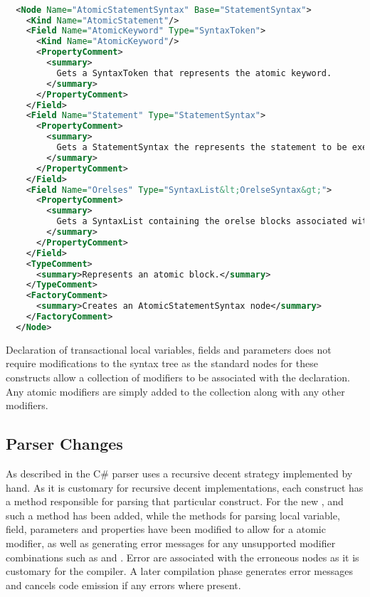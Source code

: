\begin{lstlisting}[label=lst:roslyn_extension_tre_xml,
  caption={AtomicStatement \ac{XML} definition},
  language=XML,  
  showspaces=false,
  showtabs=false,
  breaklines=true,
  showstringspaces=false,
  breakatwhitespace=true,
  escapechar=~,
  morekeywords={Name, Base, Type}]  % Start your code-block

  <Node Name="AtomicStatementSyntax" Base="StatementSyntax">
    <Kind Name="AtomicStatement"/>
    <Field Name="AtomicKeyword" Type="SyntaxToken">
      <Kind Name="AtomicKeyword"/>
      <PropertyComment>
        <summary>
          Gets a SyntaxToken that represents the atomic keyword.
        </summary>
      </PropertyComment>
    </Field>
    <Field Name="Statement" Type="StatementSyntax">
      <PropertyComment>
        <summary>
          Gets a StatementSyntax the represents the statement to be executed when the condition is true.
        </summary>
      </PropertyComment>
    </Field>
    <Field Name="Orelses" Type="SyntaxList&lt;OrelseSyntax&gt;">
      <PropertyComment>
        <summary>
          Gets a SyntaxList containing the orelse blocks associated with the atomic statement.
        </summary>
      </PropertyComment>
    </Field>
    <TypeComment>
      <summary>Represents an atomic block.</summary>
    </TypeComment>
    <FactoryComment>
      <summary>Creates an AtomicStatementSyntax node</summary>
    </FactoryComment>
  </Node>
\end{lstlisting}

Declaration of transactional local variables, fields and parameters does not require modifications to the syntax tree as the standard nodes for these constructs allow a collection of modifiers to be associated with the declaration. Any atomic modifiers are simply added to the collection along with any other modifiers. 


\subsection{Parser Changes}
As described in  the C\# parser uses a recursive decent strategy implemented by hand. As it is customary for recursive decent implementations, each construct has a method responsible for parsing that particular construct. For the new ,  and  such a method has been added, while the methods for parsing local variable, field, parameters and properties have been modified to allow for a atomic modifier, as well as generating error messages for any unsupported modifier combinations such as  and . Error are associated with the erroneous nodes as it is customary for the compiler. A later compilation phase generates error messages and cancels code emission if any errors where present.

